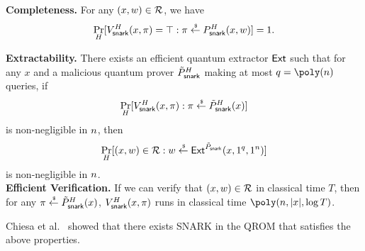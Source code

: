 \noindent\textbf{Completeness.}
For any $(x,w)\in\mathcal{R}$, we have 
\begin{align*}
    \Pr_{H}[V_{\mathsf{snark}}^H(x,\pi)=\top:\pi\overset{\hspace{0.1em}\mathsf{\scriptscriptstyle\$}}{\leftarrow} P_{\mathsf{snark}}^H(x,w)]=1.
\end{align*}

\noindent\textbf{Extractability.}
There exists an efficient quantum extractor $\mathsf{Ext}$ such that
for any $x$ and a malicious quantum prover $\tilde{P}_{\mathsf{snark}}^{H}$ making at most $q=\poly(\secpar)$ queries, if 
\begin{align*}
    \Pr_H[V_{\mathsf{snark}}^H(x,\pi):\pi \overset{\hspace{0.1em}\mathsf{\scriptscriptstyle\$}}{\leftarrow} \tilde{P}_{\mathsf{snark}}^H(x)]
\end{align*}
is non-negligible in $n$, then 
\begin{align*}
    \Pr_H[(x,w)\in \mathcal{R}: w\overset{\hspace{0.1em}\mathsf{\scriptscriptstyle\$}}{\leftarrow} \mathsf{Ext}^{\tilde{P}_{\mathsf{snark}}}(x,1^q,1^n)]
\end{align*}
is non-negligible in $n$.\\

\noindent\textbf{Efficient Verification.}
If we can verify that $(x,w)\in \mathcal{R}$ in classical time $T$, then for any $\pi \overset{\hspace{0.1em}\mathsf{\scriptscriptstyle\$}}{\leftarrow} \tilde{P}_{\mathsf{snark}}^H(x)$, $V_{\mathsf{snark}}^H(x,\pi)$ runs in classical time $\poly(\secpar,|x|,\log T)$.

Chiesa et al.~\cite{TCC:ChiManSpo19} showed that there exists SNARK in the QROM that satisfies the above properties.